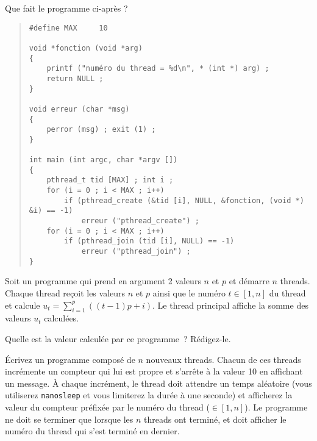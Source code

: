 %


% 

\question	%

Que fait le programme ci-après ?

\begin {quote}
\begin {verbatim}
#define MAX     10

void *fonction (void *arg)
{
    printf ("numéro du thread = %
    return NULL ;
}

void erreur (char *msg)
{
    perror (msg) ; exit (1) ;
}

int main (int argc, char *argv [])
{
    pthread_t tid [MAX] ; int i ;
    for (i = 0 ; i < MAX ; i++)
        if (pthread_create (&tid [i], NULL, &fonction, (void *) &i) == -1)
            erreur ("pthread_create") ;
    for (i = 0 ; i < MAX ; i++)
        if (pthread_join (tid [i], NULL) == -1)
            erreur ("pthread_join") ;
}
\end{verbatim}
\end {quote}


\question	%

Soit un programme qui prend en argument 2 valeurs $n$ et $p$ et démarre
$n$ threads.  Chaque thread reçoit les valeurs $n$ et $p$ ainsi que
le numéro $t \in [1,n]$ du thread et calcule $u_t = \sum_{i=1}^{p}
((t-1)p + i)$. Le thread principal affiche la somme des valeurs $u_t$
calculées.

Quelle est la valeur calculée par ce programme~? Rédigez-le.



\question	%

Écrivez un programme composé de $n$ nouveaux threads. Chacun de ces
threads incrémente un compteur qui lui est propre et s'arrête à
la valeur 10 en affichant un message. À chaque incrément, le thread
doit attendre un temps aléatoire (vous utiliserez \texttt {nanosleep}
et vous limiterez la durée à une seconde) et afficherez la valeur
du compteur préfixée par le numéro du thread ($\in [1,n]$). Le
programme ne doit se terminer que lorsque les $n$ threads ont terminé,
et doit afficher le numéro du thread qui s'est terminé en dernier.


